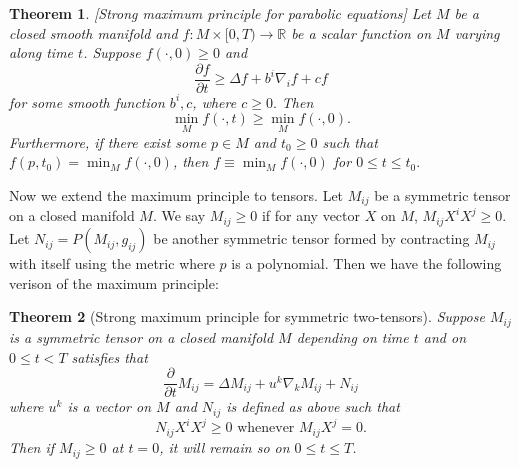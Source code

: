 \documentclass[a4paper]{report}
\newtheorem{theorem}{Theorem}
\newcommand{\R}{\mathbb{R}}
\theoremstyle{remark}
\begin{document}
\begin{theorem} \label{thm:MPP}[Strong maximum principle for parabolic equations]
	Let $M$ be a closed smooth manifold and $f: M \times [0,T) \to \R$ be a scalar function on $M$ varying along time $t$. Suppose $f (\cdot,0) \geq 0$ and
	\[
		\frac{\partial f}{\partial t} \geq \Delta f + b^{i} \nabla_{i}^{} f+ cf
	\]
	for some smooth function $b^i,c$, where $c \geq 0.$ Then
	\[\min _M f (\cdot,t) \geq \min _M f (\cdot,0).\]
	Furthermore, if there exist some $p \in M$ and $t_0 \geq 0$ such that $f(p,t_0)=\min _M f (\cdot,0) $, then $f \equiv \min _M f (\cdot,0)$ for $0 \leq t \leq t_0.$
\end{theorem}

Now we extend the maximum principle to tensors. Let $M_{ij}$ be a symmetric tensor on a closed manifold $M$. We say $M_{ij }^{} \geq 0 $ if for any vector $X$ on $M$, $M_{ij }^{} X^i X^j \geq 0$. Let $N_{ij }^{} = P(M_{ij }^{} , g_{ij}^{} )$ be another symmetric tensor formed by contracting $M_{ij }^{} $ with itself using the metric where $p$ is a polynomial. Then we have the following verison of the maximum principle:

\begin{theorem}[Strong maximum principle for symmetric two-tensors] \label{thm:MP2T}
	Suppose $M_{ij }^{} $ is a symmetric tensor on a closed manifold $M$ depending on time $t$ and on $0 \leq t < T$ satisfies that \[\frac{\partial }{\partial t} M_{ij }^{} = \Delta M_{ij }^{} + u^k \nabla_{k}^{} M_{ij }^{} + N_{ij }^{} \] where $u^k$ is a vector on $M$ and $N_{ij }^{} $ is defined as above such that 
	\[
		N_{ij }^{} X^i X^j \geq 0 \text{   whenever  } M_{ij }^{} X^j =0.
	\]
	Then if $M_{ij }^{} \geq 0$ at $t=0$, it will remain so on $0 \leq t \leq T$.
\end{theorem}
\end{document}

